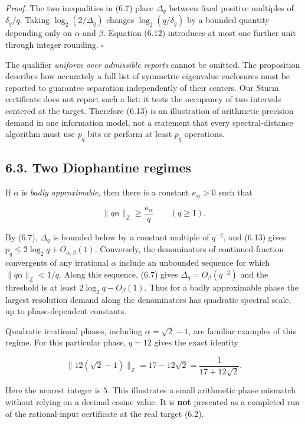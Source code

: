 \documentclass[
  11pt,
]{article}
\begin{document}
\emph{Proof.} The two inequalities in (6.7) place \(\Delta_q\) between
fixed positive multiples of \(\delta_q/q\). Taking
\(\log_2(2/\Delta_q)\) changes \(\log_2(q/\delta_q)\) by a bounded
quantity depending only on \(\alpha\) and \(\beta\). Equation (6.12)
introduces at most one further unit through integer rounding.
\(\square\)

The qualifier \emph{uniform over admissible reports} cannot be omitted.
The proposition describes how accurately a full list of symmetric
eigenvalue enclosures must be reported to guarantee separation
independently of their centers. Our Sturm certificate does not report
such a list: it tests the occupancy of two intervals centered at the
target. Therefore (6.13) is an illustration of arithmetic precision
demand in one information model, not a statement that every
spectral-distance algorithm must use \(p_q\) bits or perform at least
\(p_q\) operations.

\subsection{6.3. Two Diophantine regimes}\label{two-diophantine-regimes}

If \(\alpha\) is \emph{badly approximable}, then there is a constant
\(\kappa_\alpha>0\) such that

\[
\|q\alpha\|_{\mathbb Z}\ge\frac{\kappa_\alpha}{q}
\qquad(q\ge1).
\tag{6.14}
\]

By (6.7), \(\Delta_q\) is bounded below by a constant multiple of
\(q^{-2}\), and (6.13) gives \(p_q\le2\log_2q+O_{\alpha,\beta}(1)\).
Conversely, the denominators of continued-fraction convergents of any
irrational \(\alpha\) include an unbounded sequence for which
\(\|q\alpha\|_{\mathbb Z}<1/q\). Along this sequence, (6.7) gives
\(\Delta_q=O_\beta(q^{-2})\) and the threshold is at least
\(2\log_2q-O_\beta(1)\). Thus for a badly approximable phase the largest
resolution demand along the denominators has quadratic spectral scale,
up to phase-dependent constants.

Quadratic irrational phases, including \(\alpha=\sqrt2-1\), are familiar
examples of this regime. For this particular phase, \(q=12\) gives the
exact identity

\[
\|12(\sqrt2-1)\|_{\mathbb Z}
=17-12\sqrt2=\frac{1}{17+12\sqrt2}.
\tag{6.15}
\]

Here the nearest integer is \(5\). This illustrates a small arithmetic
phase mismatch without relying on a decimal cosine value. It is
\textbf{not} presented as a completed run of the rational-input
certificate at the real target (6.2).
\end{document}
